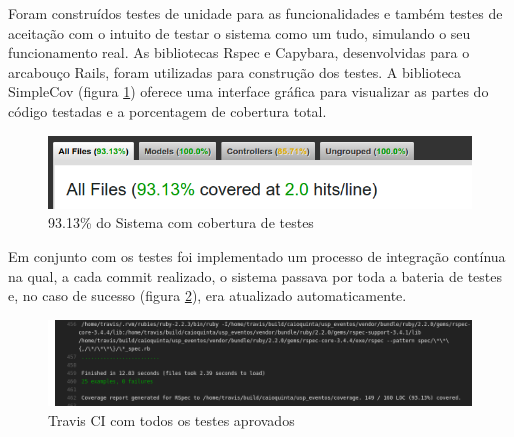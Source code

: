 \par Foram construídos testes de unidade para as funcionalidades e também testes de aceitação com o intuito de testar o sistema como um tudo, simulando o seu funcionamento real.  As bibliotecas Rspec e Capybara, desenvolvidas para o arcabouço Rails, foram utilizadas para construção dos testes.  A biblioteca SimpleCov (figura \ref{fig:simplecov}) oferece uma interface gráfica para visualizar as partes do código testadas e a porcentagem de cobertura total.
\begin{figure}[!htb]
\centering
\includegraphics[width=15cm]{figuras/simplecov}
\caption{\label{fig:simplecov} 93.13\% do Sistema com cobertura de testes }
\end{figure}
\par Em conjunto com os testes foi implementado um processo de integração contínua na qual, a cada commit realizado, o sistema passava por toda a bateria de testes e, no caso de sucesso (figura \ref{fig:travis-passed}), era atualizado automaticamente.
\begin{figure}[!htb]
\centering
\includegraphics[width=15cm]{figuras/travis-passed}
\caption{\label{fig:travis-passed} Travis CI com todos os testes aprovados}
\end{figure}
